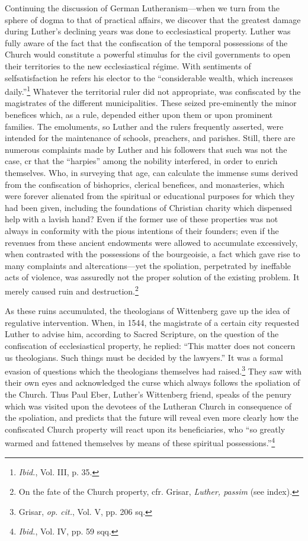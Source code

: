 Continuing the discussion of German Lutheranism—when we turn
from the sphere of dogma to that of practical affairs, we discover
that the greatest damage during Luther’s declining years was done to
ecclesiastical property. Luther was fully aware of the fact that the
confiscation of the temporal possessions of the Church would constitute
a powerful stimulus for the civil governments to open their territories
to the new ecclesiastical régime. With sentiments of selfsatisfaction
he refers his elector to the “considerable wealth, which
increases daily.”\footnote{\textit{Ibid.}, Vol. III, p. 35.}
 Whatever the territorial ruler did not appropriate,
was confiscated by the magistrates of the different municipalities. These
seized pre-eminently the minor benefices which, as a rule,
depended either upon them or upon prominent families. The emoluments,
so Luther and the rulers frequently asserted, were intended
for the maintenance of schools, preachers, and parishes. Still, there
are numerous complaints made by Luther and his followers that such
was not the case, cr that the “harpies” among the nobility interfered,
in order to enrich themselves. Who, in surveying that age, can calculate
the immense sums derived from the confiscation of bishoprics,
clerical benefices, and monasteries, which were forever alienated
from the spiritual or educational purposes for which they had been
given, including the foundations of Christian charity which dispensed
help with a lavish hand? Even if the former use of these
properties was not always in conformity with the pious intentions
of their founders; even if the revenues from these ancient endowments
were allowed to accumulate excessively, when contrasted with
the possessions of the bourgeoisie, a fact which gave rise to many
complaints and altercations—yet the spoliation, perpetrated by ineffable
acts of violence, was assuredly not the proper solution of the
existing problem. It merely caused ruin and destruction.\footnote
{On the fate of the Church property, cfr. Grisar, \textit{Luther, passim} (see index).}

As these ruins accumulated, the theologians of Wittenberg gave up
the idea of regulative intervention. When, in 1544, the magistrate
of a certain city requested Luther to advise him, according to Sacred
Scripture, on the question of the confiscation of ecclesiastical property,
he replied: “This matter does not concern us theologians. Such
things must be decided by the lawyers.” It was a formal evasion of
questions which the theologians themselves had raised.\footnote{Grisar, \textit{op. cit.}, Vol. V, pp. 206 sq.}
They saw with their own eyes and acknowledged the curse which always follows
the spoliation of the Church. Thus Paul Eber, Luther’s Wittenberg
friend, speaks of the penury which was visited upon the devotees
of the Lutheran Church in consequence of the spoliation, and predicts
that the future will reveal even more clearly how the confiscated Church
property will react upon its beneficiaries, who “so
greatly warmed and fattened themselves by means of these spiritual
possessions.”\footnote{\textit{Ibid.}, Vol. IV, pp. 59 sqq.}


